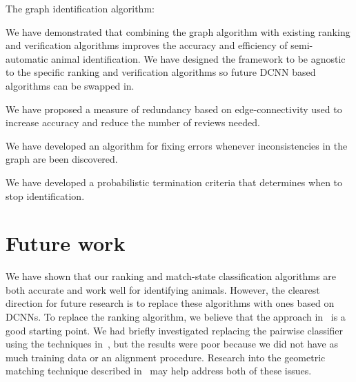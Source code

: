 \begin{enumln}
    \item {The graph identification algorithm}:
        \begin{enumln}

        \item 
            We have demonstrated that combining the graph algorithm with existing ranking and verification
              algorithms improves the accuracy and efficiency of semi-automatic animal identification.
            We have designed the framework to be agnostic to the specific ranking and verification algorithms so
              future DCNN based algorithms can be swapped in.

        \item We have proposed a measure of redundancy based on edge-connectivity used to increase accuracy and
          reduce the number of reviews needed.

        \item We have developed an algorithm for fixing errors whenever inconsistencies in the graph are been
          discovered.

        \item We have developed a probabilistic termination criteria that determines when to stop identification.
        \end{enumln}
    \end{enumln}

    \section{Future work}\label{sec:futurework}

    We have shown that our ranking and match-state classification algorithms are both accurate and work well for
      identifying animals.
    However, the clearest direction for future research is to replace these algorithms with ones based on DCNNs.
    To replace the ranking algorithm, we believe that the approach in~\cite{arandjelovic_netvlad_2016} is a good
      starting point.
    We had briefly investigated replacing the pairwise classifier using the techniques
      in~\cite{taigman_deepface_2014}, but the results were poor because we did not have as much training data or
      an alignment procedure.
    Research into the geometric matching technique described in~\cite{rocco_convolutional_2017} may help address
      both of these issues.

